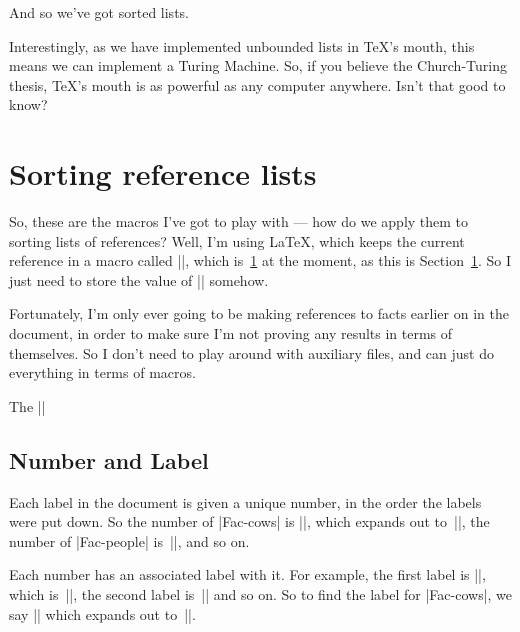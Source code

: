 And so we've got sorted lists.

Interestingly, as we have implemented unbounded lists in \TeX's mouth,
this means we can implement a Turing Machine.  So, if you believe
the Church-Turing thesis, \TeX's mouth is as powerful as any
computer anywhere.  Isn't that good to know?



\section{Sorting reference lists}
\label{thissection}

So, these are the macros I've got to play with --- how do we apply them to
sorting lists of references?  Well, I'm using \LaTeX, which keeps the
current reference in a macro called |\@currentlabel|, which 
is~\ref{thissection} at the moment, as this is Section~\ref{thissection}.
So I just need to store the value of |\@currentlabel| somehow.

Fortunately, I'm only ever going to be making references to facts
earlier on in the document, in order to make sure I'm not proving
any results in terms of themselves.  So I don't need to play around
with auxiliary files, and can just do everything in terms of
macros.

\makeatletter

The |\@currentlabel|  \@currentlabel 
\makeatother


\subsection{Number and Label}

Each label in the document is given a unique number, in the order
the labels were put down.  So the number of |Fac-cows| 
is ||, which expands out to~||,
the number of |Fac-people| is~||, and so on.

Each number has an associated label with it.  For example,
the first label is ||, which is~||,
the second label is~|| and so on.  So to find the label for
|Fac-cows|, we say || which expands 
out to~||.

